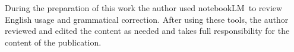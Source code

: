 During the preparation of this work the author used notebookLM\texttrademark ~to review English usage and grammatical correction. After using these tools, the author reviewed and edited the content as needed and takes full responsibility for the content of the publication.
